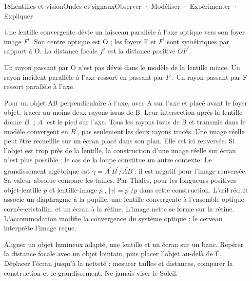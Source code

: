 \begin{ouverture}[lunette]{18}{Lentilles et vision}{Ondes et signaux}{Observer · Modéliser · Expérimenter · Expliquer}
\end{ouverture}
\essentiel
{}
Une lentille convergente dévie un faisceau parallèle à l'axe optique vers son foyer image $F^{\prime}$. Son centre optique est O ; les foyers F et $F^{\prime}$ sont symétriques par rapport à O. La distance focale $f'$ est la distance positive $OF^{\prime}$.
\begin{propriete}Un rayon passant par O n'est pas dévié dans le modèle de la lentille mince. Un rayon incident parallèle à l'axe ressort en passant par $F^{\prime}$. Un rayon passant par F ressort parallèle à l'axe.\end{propriete}
Pour un objet AB perpendiculaire à l'axe, avec A sur l'axe et placé avant le foyer objet, tracer au moins deux rayons issus de B. Leur intersection après la lentille donne $B^{\prime}$ ; $A^{\prime}$ est le pied sur l'axe. Tous les rayons issus de B et transmis dans le modèle convergent en $B^{\prime}$, pas seulement les deux rayons tracés.
Une image réelle peut être recueillie sur un écran placé dans son plan. Elle est ici renversée. Si l'objet est trop près de la lentille, la construction d'une image réelle sur écran n'est plus possible : le cas de la loupe constitue un autre contexte.
Le grandissement algébrique est $\gamma=\overline{A^{\prime}B^{\prime}}/\overline{AB}$ : il est négatif pour l'image renversée. Sa valeur absolue compare les tailles. Par Thalès, pour les longueurs positives objet-lentille $p$ et lentille-image $p^{\prime}$, $|\gamma|=p^{\prime}/p$ dans cette construction.
L'œil réduit associe un diaphragme à la pupille, une lentille convergente à l'ensemble optique cornée-cristallin, et un écran à la rétine. L'image nette se forme sur la rétine. L'accommodation modifie la convergence du système optique ; le cerveau interprète l'image reçue.
\begin{experience}Aligner un objet lumineux adapté, une lentille et un écran sur un banc. Repérer la distance focale avec un objet lointain, puis placer l'objet au-delà de F. Déplacer l'écran jusqu'à la netteté ; mesurer tailles et distances, comparer la construction et le grandissement. Ne jamais viser le Soleil.\end{experience}
